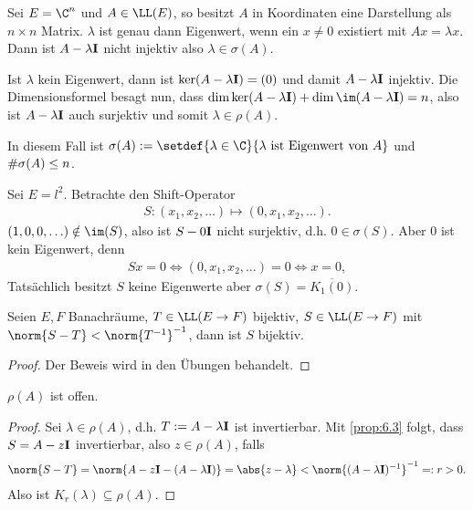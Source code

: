 \begin{bsp}
\label{bsp:6.2}
\begin{bspenum}
  \item Sei $E=\C^n$ und $A\in\LL(E)$, so besitzt $A$ in Koordinaten eine 
  Darstellung als $n\times n$ Matrix. $\lambda$ ist genau dann
  Eigenwert, wenn ein $x\neq 0$ existiert mit $Ax=\lambda x$. Dann ist $A-\lambda \mathbf{I}$ nicht injektiv also $\lambda\in\sigma(A)$.

Ist $\lambda$ kein Eigenwert, dann ist $\ker(A-\lambda\mathbf{I})=(0)$ und damit
$A-\lambda\mathbf{I}$ injektiv. Die Dimensionsformel besagt nun, dass
$\dim\ker(A-\lambda\Id)+\dim\im (A-\lambda\Id) = n$, also ist $A-\lambda\mathbf{I}$
auch surjektiv und somit $\lambda\in\rho(A)$.

In diesem Fall ist $\sigma(A) := \setdef{\lambda\in\C}{\lambda \text{ ist
Eigenwert von }A}$ und $\#\sigma(A)\le n$.
  \item Sei $E=l^2$. Betrachte den Shift-Operator 
\begin{align*}
S:(x_1,x_2,\ldots) \mapsto (0,x_1,x_2,\ldots).
\end{align*}
$(1,0,0,\ldots)\notin\im (S)$, also ist $S-0\mathbf{I}$ nicht surjektiv, d.h.
$0\in\sigma(S)$. Aber $0$ ist kein Eigenwert, denn
\begin{align*}
Sx = 0\Leftrightarrow (0,x_1,x_2,\ldots) = 0\Leftrightarrow x=0,
\end{align*}
Tatsächlich besitzt $S$ keine Eigenwerte aber $\sigma(S) =
\overline{K_1(0)}$.\bsphere 
\end{bspenum}
\end{bsp}

\begin{lem}
\label{prop:6.3}
Seien $E,F$ Banachräume, $T\in\LL(E\to F)$ bijektiv, $S\in\LL(E\to F)$ mit
$\norm{S-T}< \norm{T^{-1}}^{-1}$, dann ist $S$ bijektiv.\fishhere
\end{lem}
\begin{proof}
Der Beweis wird in den Übungen behandelt.\qedhere
\end{proof}

\begin{cor}
\label{prop:6.4}
$\rho(A)$ ist offen.\fishhere
\end{cor}
\begin{proof}
Sei $\lambda\in\rho(A)$, d.h. $T:=A-\lambda\mathbf{I}$ ist invertierbar. Mit
\ref{prop:6.3} folgt, dass $S=A-z\mathbf{I}$ invertierbar, also $z\in\rho(A)$, falls
\begin{align*}
\norm{S-T} = \norm{A-z\Id-(A-\lambda\Id)} = \abs{z-\lambda} <
\norm{(A-\lambda\Id)^{-1}}^{-1} =: r > 0.
\end{align*}
Also ist $K_r(\lambda)\subseteq \rho(A)$.\qedhere
\end{proof}

